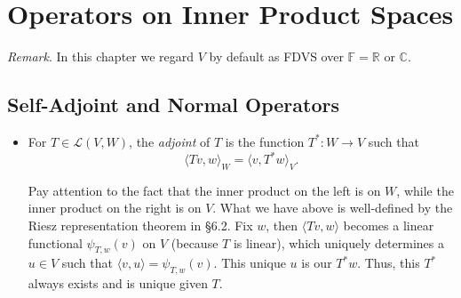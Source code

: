 \documentclass{article}
\newcommand{\R}{\mathbb{R}}
\newcommand{\C}{\mathbb{C}}
\newcommand{\F}{\mathbb{F}}
\newcommand{\inp}[2]{\langle #1, #2 \rangle}
\newcommand{\LVW}{\mathcal{L}(V,W)}
\begin{document}
\section{Operators on Inner Product Spaces}
\textit{Remark}. In this chapter we regard $V$ by default as FDVS over $\F = \R$ or $\C$.
\subsection{Self-Adjoint and Normal Operators}
\begin{itemize}
    \item For $T \in \LVW$, the \textit{adjoint} of $T$ is the function $T^*: W \to V$ such that $$\inp{Tv}{w}_W = \inp{v}{T^*w}_V.$$
    
    Pay attention to the fact that the inner product on the left is on $W$, while the inner product on the right is on $V$. What we have above is well-defined by the Riesz representation theorem in \S6.2. Fix $w$, then $\inp{Tv}{w}$ becomes a linear functional $\psi_{T,w}(v)$ on $V$ (because $T$ is linear), which uniquely determines a $u \in V$ such that $\inp{v}{u} = \psi_{T,w}(v)$. This unique $u$ is our $T^*w$. Thus, this $T^*$ always exists and is unique given $T$.
    

\end{itemize}
\end{document}
